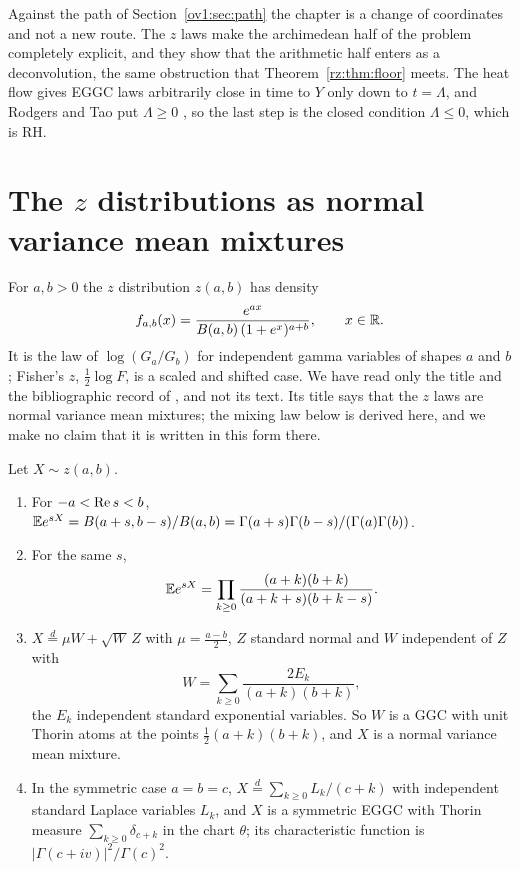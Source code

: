 Against the path of Section~\ref{ov1:sec:path} the chapter is a change of coordinates and not a new route. The $z$ laws make the archimedean half of the problem completely explicit, and they show that the arithmetic half enters as a deconvolution, the same obstruction that Theorem~\ref{rz:thm:floor} meets. The heat flow gives EGGC laws arbitrarily close in time to $Y$ only down to $t=\Lambda$, and Rodgers and Tao put $\Lambda\ge0$ \cite{RodgersTao}, so the last step is the closed condition $\Lambda\le0$, which is RH.

\section{The \texorpdfstring{$z$}{z} distributions as normal variance mean mixtures}\label{zdist:sec:z}

For $a,b>0$ the $z$ distribution $z(a,b)$ has density
\begin{equation}\label{zdist:eq:density}
f_{a,b}(x)=\frac{e^{ax}}{B(a,b)\,(1+e^x)^{a+b}},\qquad x\in\mathbb{R} .
\end{equation}
It is the law of $\log(G_a/G_b)$ for independent gamma variables of shapes $a$ and $b$; Fisher's $z$, $\frac12\log F$, is a scaled and shifted case. We have read only the title and the bibliographic record of \cite{BNKS82}, and not its text. Its title says that the $z$ laws are normal variance mean mixtures; the mixing law below is derived here, and we make no claim that it is written in this form there. %

\begin{proposition}\label{zdist:prop:mix}
Let $X\sim z(a,b)$.
\begin{enumerate}
\item[(i)] For $-a<\operatorname{Re} s<b$, $\mathbb{E} e^{sX}=B(a+s,b-s)/B(a,b)=\Gamma(a+s)\Gamma(b-s)/(\Gamma(a)\Gamma(b))$.
\item[(ii)] For the same $s$,
\[
\mathbb{E} e^{sX}=\prod_{k\ge0}\frac{(a+k)(b+k)}{(a+k+s)(b+k-s)} .
\]
\item[(iii)] $X\stackrel d=\mu W+\sqrt W\,Z$ with $\mu=\frac{a-b}2$, $Z$ standard normal and $W$ independent of $Z$ with
\[
W=\sum_{k\ge0}\frac{2E_k}{(a+k)(b+k)},
\]
the $E_k$ independent standard exponential variables. So $W$ is a GGC with unit Thorin atoms at the points $\frac12(a+k)(b+k)$, and $X$ is a normal variance mean mixture.
\item[(iv)] In the symmetric case $a=b=c$, $X\stackrel d=\sum_{k\ge0}L_k/(c+k)$ with independent standard Laplace variables $L_k$, and $X$ is a symmetric EGGC with Thorin measure $\sum_{k\ge0}\delta_{c+k}$ in the chart $\theta$; its characteristic function is $|\Gamma(c+iv)|^2/\Gamma(c)^2$.
\end{enumerate}
\end{proposition}

